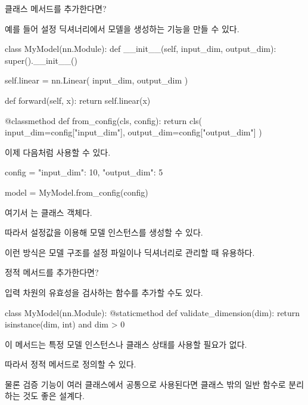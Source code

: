 \begin{dhknote}
\begin{dhksmry}[centered]
클래스 메서드를 추가한다면?
\end{dhksmry}
\end{dhknote}

예를 들어 설정 딕셔너리에서 모델을 생성하는 기능을 만들 수 있다.

\begin{dhkcode}
class MyModel(nn.Module):
    def __init__(self, input_dim, output_dim):
        super().__init__()

        self.linear = nn.Linear(
            input_dim,
            output_dim
        )

    def forward(self, x):
        return self.linear(x)

    @classmethod
    def from_config(cls, config):
        return cls(
            input_dim=config["input_dim"],
            output_dim=config["output_dim"]
        )
\end{dhkcode}

이제 다음처럼 사용할 수 있다.

\begin{dhkcode}
config = {
    "input_dim": 10,
    "output_dim": 5
}

model = MyModel.from_config(config)
\end{dhkcode}

여기서 는  클래스 객체다.

따라서 설정값을 이용해 모델 인스턴스를 생성할 수 있다.

이런 방식은 모델 구조를 설정 파일이나 딕셔너리로 관리할 때 유용하다.

\begin{dhknote}
\begin{dhksmry}[centered]
정적 메서드를 추가한다면?
\end{dhksmry}
\end{dhknote}

입력 차원의 유효성을 검사하는 함수를 추가할 수도 있다.

\begin{dhkcode}
class MyModel(nn.Module):
    @staticmethod
    def validate_dimension(dim):
        return isinstance(dim, int) and dim > 0
\end{dhkcode}

이 메서드는 특정 모델 인스턴스나 클래스 상태를 사용할 필요가 없다.

따라서 정적 메서드로 정의할 수 있다.

물론 검증 기능이 여러 클래스에서 공통으로 사용된다면 클래스 밖의 일반 함수로 분리하는 것도 좋은 설계다.

